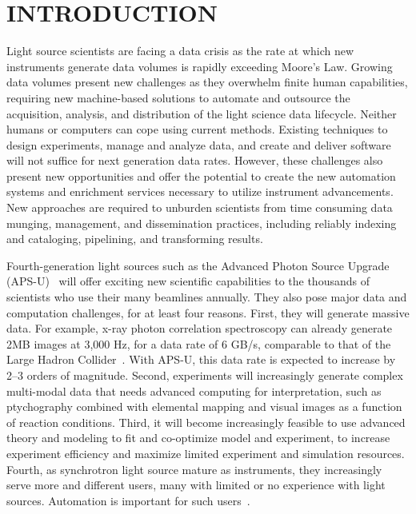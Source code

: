 \documentclass{aip-cp}
\newcommand\ian[1]{}
\newcommand\ryan[1]{}
\newcommand\ian[1]{{\color{red}[Ian: #1]}}
\newcommand\ryan[1]{{\color{green}[Ryan: #1]}}
\begin{document}
\ian{Potential authors: Tekin Bicer, Ben Blaiszik, Kyle Chard, Ryan Chard, Logan Ward, Justin Wozniak, ...}


\section{INTRODUCTION}

\ryan{Proposed new structure to follow the talk: Introduction, history/background, automation and 
outsourcing (high level motivation), acquisition and distribution (dmagic/petrel), publication and 
discovery (mdf/search), automation (automate, TAP), transformation and analysis (dlhub).}

Light source scientists are facing a data crisis as the rate at which new instruments generate data 
volumes is rapidly exceeding Moore's Law. Growing data 
volumes present new challenges as they overwhelm finite human capabilities, requiring new 
machine-based solutions to automate and outsource the acquisition, analysis, and 
distribution of the 
light science data lifecycle. Neither humans or computers can cope using current methods. Existing 
techniques to design experiments, manage and analyze data, and create and 
deliver software will not suffice for next generation data rates. However, these 
challenges also present new opportunities and offer the potential to create the new automation 
systems and enrichment services necessary to utilize instrument advancements. New 
approaches are required to unburden scientists from time consuming data munging, management, 
and dissemination practices, including reliably indexing and cataloging, pipelining, and 
transforming results.

Fourth-generation light sources such as the Advanced Photon Source Upgrade (APS-U)~\cite{APSU} will offer exciting new
scientific capabilities to the thousands of scientists who use their many beamlines annually.
They also pose major data and computation challenges, for at least four reasons.
First, they will generate massive data. 
For example, x-ray photon correlation spectroscopy can already generate 2MB images at 3,000 Hz,
for a data rate of 6 GB/s, comparable to that of the Large Hadron Collider~\cite{lhcrate}.
With APS-U, this data rate is expected to increase by 2--3 orders of magnitude.
Second, experiments will increasingly generate complex multi-modal data that needs advanced computing
for interpretation, such as ptychography combined with 
elemental mapping and visual images as a function of reaction conditions.
Third, it will become increasingly feasible to use advanced theory and modeling to fit and co-optimize 
model and experiment, to increase experiment efficiency and maximize limited experiment and 
simulation resources.
Fourth, as synchrotron light source mature as instruments, they increasingly serve more and 
different users,
many with limited or no experience with light sources. 
Automation is important for such users~\cite{hiraki2008high,toby2009management}.
\end{document}
